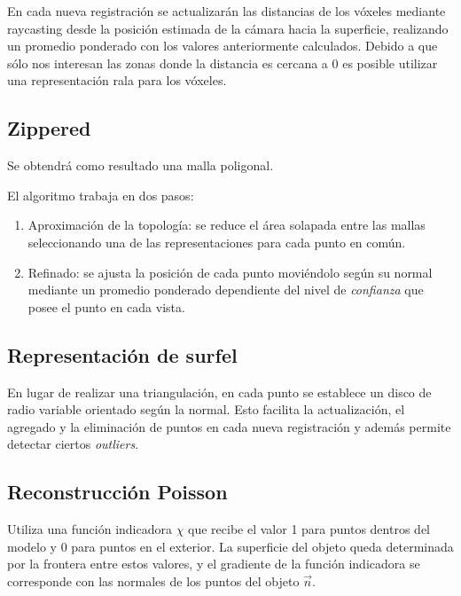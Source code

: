 \documentclass{pfc}
\begin{document}
		En cada nueva registración se actualizarán las distancias de los
		vóxeles mediante raycasting
		desde la posición estimada de la cámara hacia la superficie,
		realizando un promedio ponderado con los valores anteriormente calculados.\cite{Curless:1996:VMB:237170.237269} %
		Debido a que sólo nos interesan las zonas donde la distancia es cercana a 0 es posible utilizar una representación rala para los vóxeles.\cite{Steinbrucker:2013:LMS:2586117.2586926} %


		\subsection{Zippered}
		Se obtendrá como resultado una malla poligonal.

		El algoritmo trabaja en dos pasos:\cite{Turk:1994:ZPM:192161.192241}
		\begin{enumerate}
			\item Aproximación de la topología: se reduce el área solapada
				entre las mallas seleccionando una de las representaciones para
				cada punto en común.
			\item Refinado: se ajusta la posición de cada punto moviéndolo
				según su normal mediante un promedio ponderado dependiente del
				nivel de \emph{confianza} que posee el punto en cada vista.
		\end{enumerate}

		\subsection{Representación de surfel}
		En lugar de realizar una triangulación, en cada punto se establece un disco de radio variable orientado según la normal.
		Esto facilita la actualización, el agregado y la eliminación de puntos en cada nueva registración y además permite detectar ciertos \emph{outliers}.\cite{5457479}

		\subsection{Reconstrucción Poisson}
		Utiliza una función indicadora $\chi$ que recibe el valor 1 para puntos
		dentros del modelo y 0 para puntos en el exterior.
		La superficie del objeto queda determinada por la frontera entre estos
		valores, y el gradiente de la función indicadora se corresponde con las
		normales de los puntos del objeto $\vec{n}$.
\end{document}
